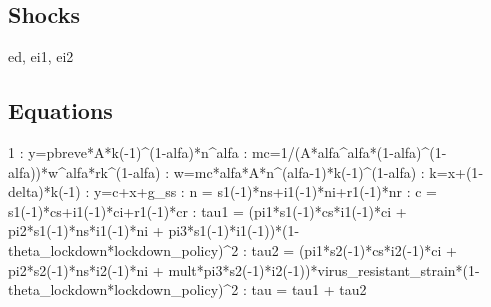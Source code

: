 \documentclass{article}%
\begin{document}
%
\subsection{Shocks}%
\label{subsec:Shocks}%
ed, ei1, ei2

%
\subsection{Equations}%
\label{subsec:Equations}%
1    :  y=pbreve*A*k({-}1)\^{}(1{-}alfa)*n\^{}alfa\newline%
    :  mc=1/(A*alfa\^{}alfa*(1{-}alfa)\^{}(1{-}alfa))*w\^{}alfa*rk\^{}(1{-}alfa)\newline%
    :  w=mc*alfa*A*n\^{}(alfa{-}1)*k({-}1)\^{}(1{-}alfa)\newline%
    :  k=x+(1{-}delta)*k({-}1)\newline%
    :  y=c+x+g\_ss\newline%
    :  n = s1({-}1)*ns+i1({-}1)*ni+r1({-}1)*nr\newline%
    :  c = s1({-}1)*cs+i1({-}1)*ci+r1({-}1)*cr\newline%
    :  tau1 = (pi1*s1({-}1)*cs*i1({-}1)*ci + pi2*s1({-}1)*ns*i1({-}1)*ni + pi3*s1({-}1)*i1({-}1))*(1{-}theta\_lockdown*lockdown\_policy)\^{}2\newline%
    :  tau2 = (pi1*s2({-}1)*cs*i2({-}1)*ci + pi2*s2({-}1)*ns*i2({-}1)*ni + mult*pi3*s2({-}1)*i2({-}1))*virus\_resistant\_strain*(1{-}theta\_lockdown*lockdown\_policy)\^{}2\newline%
   :  tau = tau1 + tau2\newline%
\end{document}
